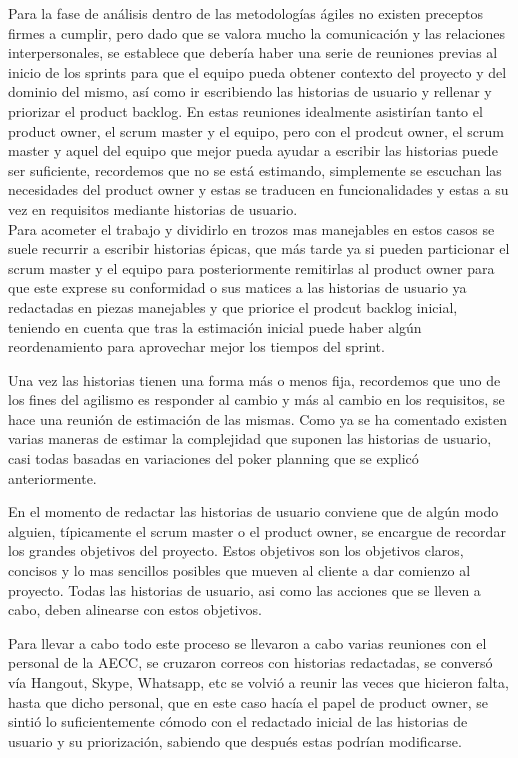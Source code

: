 \documentclass[../pfc.tex]{subfiles}
\begin{document}
	
Para la fase de análisis dentro de las metodologías ágiles no existen preceptos firmes a cumplir, pero dado que se valora mucho la comunicación y las relaciones interpersonales, se establece que debería haber una serie de reuniones previas al inicio de los sprints para que el equipo pueda obtener contexto del proyecto y del dominio del mismo, así como ir escribiendo las historias de usuario y rellenar y priorizar el product backlog. En estas reuniones idealmente asistirían tanto el product owner, el scrum master y el equipo, pero con el prodcut owner, el scrum master y aquel del equipo que mejor pueda ayudar a escribir las historias puede ser suficiente, recordemos que no se está estimando, simplemente se escuchan las necesidades del product owner y estas se traducen en funcionalidades y estas a su vez en requisitos mediante historias de usuario. \\

Para acometer el trabajo y dividirlo en trozos mas manejables en estos casos se suele recurrir a escribir historias épicas, que más tarde ya si pueden particionar el scrum master y el equipo para posteriormente remitirlas al product owner para que este exprese su conformidad o sus matices a las historias de usuario ya redactadas en piezas manejables y que priorice el prodcut backlog inicial, teniendo en cuenta que tras la estimación inicial puede haber algún reordenamiento para aprovechar mejor los tiempos del sprint. 

Una vez las historias tienen una forma más o menos fija, recordemos que uno de los fines del agilismo es responder al cambio y más al cambio en los requisitos, se hace una reunión de estimación de las mismas. Como ya se ha comentado existen varias maneras de estimar la complejidad que suponen las historias de usuario, casi todas basadas en variaciones del poker planning que se explicó anteriormente. 

En el momento de redactar las historias de usuario conviene que de algún modo alguien, típicamente el scrum master o el product owner, se encargue de recordar los grandes objetivos del proyecto. Estos objetivos son los objetivos claros, concisos y lo mas sencillos posibles que mueven al cliente a dar comienzo al proyecto. Todas las historias de usuario, asi como las acciones que se lleven a cabo, deben alinearse con estos objetivos.

Para llevar a cabo todo este proceso se llevaron a cabo varias reuniones con el personal de la AECC, se cruzaron correos con historias redactadas, se conversó vía Hangout, Skype, Whatsapp, etc se volvió a reunir las veces que hicieron falta, hasta que dicho personal, que en este caso hacía el papel de product owner,  se sintió lo suficientemente cómodo con el redactado inicial de las historias de usuario y su priorización, sabiendo que después estas podrían modificarse. 
	
\end{document}
